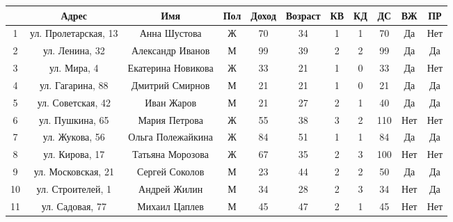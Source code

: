 \begin{table}[h]
\begin{tabular}{|c|c|c|c|c|c|c|c|c|c|c|}
\hline
   & Адрес     & Имя             & Пол & Доход & Возраст & КВ & КД & ДС & ВЖ & ПР \\ \hline
1  & ул. Пролетарская, 13 & Анна Шустова       & Ж      & 70       & 34         & 1                   & 1                & 70          & Да              & Нет                   \\ \hline
2  & ул. Ленина, 32       & Александр Иванов   & М      & 99       & 39         & 2                   & 2                & 99          & Да              & Да                    \\ \hline
3  & ул. Мира, 4          & Екатерина Новикова & Ж      & 33       & 21         & 1                   & 0                & 33          & Да              & Нет                   \\ \hline
4  & ул. Гагарина, 88     & Дмитрий Смирнов    & М      & 21       & 21         & 1                   & 0                & 21          & Да              & Да                    \\ \hline
5  & ул. Советская, 42    & Иван Жаров        & М      & 21       & 27         & 2                   & 1                & 40          & Да              & Да                    \\ \hline
6  & ул. Пушкина, 65      & Мария Петрова      & Ж      & 55       & 38         & 3                   & 2                & 110         & Нет             & Нет                   \\ \hline
7  & ул. Жукова, 56       & Ольга Полежайкина     & Ж      & 84       & 51         & 1                   & 1                & 84          & Да              & Да                    \\ \hline
8  & ул. Кирова, 17       & Татьяна Морозова   & Ж      & 67       & 35         & 2                   & 3                & 100         & Нет             & Нет                   \\ \hline
9  & ул. Московская, 21   & Сергей Соколов     & М      & 23       & 44         & 2                   & 2                & 50          & Да              & Да                    \\ \hline
10 & ул. Строителей, 1    & Андрей Жилин     & М      & 34       & 28         & 2                   & 3                & 34          & Нет             & Да                    \\ \hline
11 & ул. Садовая, 77      & Михаил Цаплев      & М      & 45       & 47         & 2                   & 1                & 45          & Нет             & Нет                   \\ \hline

\end{tabular}
\end{table}
